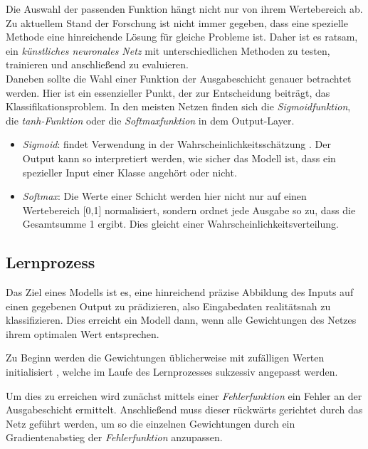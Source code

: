 Die Auswahl der passenden Funktion hängt nicht nur von ihrem Wertebereich ab. Zu aktuellem Stand der Forschung ist nicht immer gegeben, dass eine spezielle Methode eine hinreichende Lösung für gleiche Probleme ist. Daher ist es ratsam, ein \textit{künstliches neuronales Netz} mit unterschiedlichen Methoden zu testen, trainieren und anschließend zu evaluieren.
\\
Daneben sollte die Wahl einer Funktion der Ausgabeschicht genauer betrachtet werden. Hier ist ein essenzieller Punkt, der zur Entscheidung beiträgt, das Klassifikationsproblem. %
In den meisten Netzen finden sich die \textit{Sigmoidfunktion}, die \textit{tanh-Funktion} oder die \textit{Softmaxfunktion} in dem Output-Layer.

\begin{itemize}
	\item \textit{Sigmoid}: findet Verwendung in der Wahrscheinlichkeitsschätzung \cite[vgl.][S. 18]{7}. Der Output kann so interpretiert werden, wie sicher das Modell ist, dass ein spezieller Input einer Klasse angehört oder nicht.
	\cite[vlg.][]{19}
	
	\item \textit{Softmax}: Die Werte einer Schicht werden hier nicht nur auf einen Wertebereich [0,1] normalisiert, sondern ordnet jede Ausgabe so zu, dass die Gesamtsumme 1 ergibt. Dies gleicht einer Wahrscheinlichkeitsverteilung. \cite[vgl.][]{18} 	
\end{itemize}

\subsection{Lernprozess}
\label{Lernprozess}
Das Ziel eines Modells ist es, eine hinreichend präzise Abbildung des Inputs auf einen gegebenen Output zu prädizieren, also Eingabedaten realitätsnah zu klassifizieren. Dies erreicht ein Modell dann, wenn alle Gewichtungen des Netzes ihrem optimalen Wert entsprechen. 

Zu Beginn werden die Gewichtungen üblicherweise mit zufälligen Werten initialisiert \cite[vgl.][S. 166]{13} \cite[vgl.][]{20}, welche im Laufe des Lernprozesses sukzessiv angepasst werden.

Um dies zu erreichen wird zunächst mittels einer \textit{Fehlerfunktion} ein Fehler an der Ausgabeschicht \cite[vgl.][]{20} ermittelt. Anschließend muss dieser rückwärts gerichtet durch das Netz geführt werden, um so die einzelnen Gewichtungen durch ein Gradientenabstieg der \textit{Fehlerfunktion} anzupassen. 

